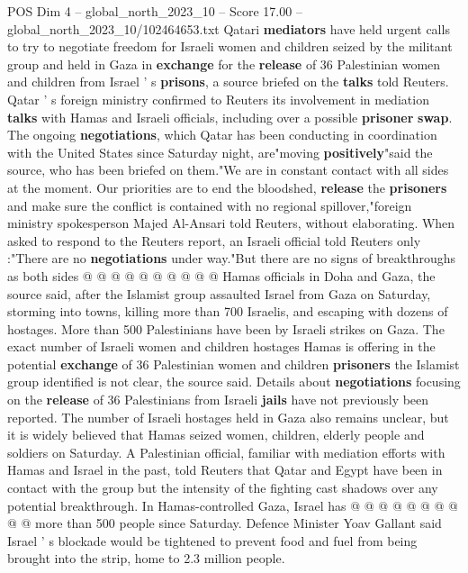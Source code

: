 \begin{textsample}{POS Dim 4 – global\_north\_2023\_10 – Score 17.00 – global\_north\_2023\_10/102464653.txt}  \label{ex:f4_pos_442}
Qatari \textbf{mediators} have held urgent calls to try to negotiate freedom for Israeli women and children seized by the militant group and held in Gaza in \textbf{exchange} for the \textbf{release} of 36 Palestinian women and children from Israel ' s \textbf{prisons}, a source briefed on the \textbf{talks} told Reuters.
Qatar ' s foreign ministry confirmed to Reuters its involvement in mediation \textbf{talks} with Hamas and Israeli officials, including over a possible \textbf{prisoner} \textbf{swap}.
The ongoing \textbf{negotiations}, which Qatar has been conducting in coordination with the United States since Saturday night, are"moving \textbf{positively}"said the source, who has been briefed on them."We are in constant contact with all sides at the moment.
Our priorities are to end the bloodshed, \textbf{release} the \textbf{prisoners} and make sure the conflict is contained with no regional spillover,"foreign ministry spokesperson Majed Al-Ansari told Reuters, without elaborating.
When asked to respond to the Reuters report, an Israeli official told Reuters only :"There are no \textbf{negotiations} under way."But there are no signs of breakthroughs as both sides @ @ @ @ @ @ @ @ @ @ Hamas officials in Doha and Gaza, the source said, after the Islamist group assaulted Israel from Gaza on Saturday, storming into towns, killing more than 700 Israelis, and escaping with dozens of hostages.
More than 500 Palestinians have been by Israeli strikes on Gaza.
The exact number of Israeli women and children hostages Hamas is offering in the potential \textbf{exchange} of 36 Palestinian women and children \textbf{prisoners} the Islamist group identified is not clear, the source said.
Details about \textbf{negotiations} focusing on the \textbf{release} of 36 Palestinians from Israeli \textbf{jails} have not previously been reported.
The number of Israeli hostages held in Gaza also remains unclear, but it is widely believed that Hamas seized women, children, elderly people and soldiers on Saturday.
A Palestinian official, familiar with mediation efforts with Hamas and Israel in the past, told Reuters that Qatar and Egypt have been in contact with the group but the intensity of the fighting cast shadows over any potential breakthrough.
In Hamas-controlled Gaza, Israel has @ @ @ @ @ @ @ @ @ @ more than 500 people since Saturday.
Defence Minister Yoav Gallant said Israel ' s blockade would be tightened to prevent food and fuel from being brought into the strip, home to 2.3 million people.

\end{textsample}
